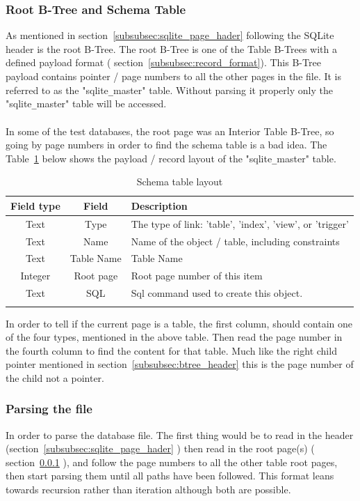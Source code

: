 \subsubsection{Root B-Tree and Schema Table}
\label{subsubsec:schema_table}

As mentioned in section~\ref{subsubsec:sqlite_page_hader} following the SQLite header is the root B-Tree. The root B-Tree is one of the Table B-Trees with a defined payload format ( section~\ref{subsubsec:record_format}). This B-Tree payload contains pointer / page numbers to all the other pages in the file. It is referred to as the "sqlite\verb|_|master" table. Without parsing it properly only the "sqlite\verb|_|master" table will be accessed.
\\\\
In some of the test databases, the root page was an Interior Table B-Tree, so going by page numbers in order to find the schema table is a bad idea. The Table~\ref{tbl:schema_table} below shows the payload / record layout of the "sqlite\verb|_|master" table.

\begin{longtable}[h]{| c | c| p{10cm} |}
		\hline
			\textbf{Field type} & \textbf{Field} & \textbf{Description} \\ 
		\hline
		\endhead
			Text & Type & The type of link: 'table', 'index', 'view', or 'trigger' \\
		\hline
			Text & Name & Name of the object / table, including constraints \\
		\hline
			Text & Table Name & Table Name \\
		\hline
			Integer & Root page & Root page number of this item \\
		\hline
			Text & SQL & Sql command used to create this object. \\
		\hline
	\caption{Schema table layout}
	\label{tbl:schema_table}
\end{longtable}

In order to tell if the current page is a table, the first column, should contain one of the four types, mentioned in the above table. Then read the page number in the fourth column to find the content for that table. Much like the right child pointer mentioned in section~\ref{subsubsec:btree_header} this is the page number of the child not a pointer.

\subsubsection{Parsing the file}
\label{subsubsec:parsing the file}

In order to parse the database file. The first thing would be to read in the header (section~\ref{subsubsec:sqlite_page_hader} ) then read in the root page(s) ( section~\ref{subsubsec:schema_table} ), and follow the page numbers to all the other table root pages, then start parsing them until all paths have been followed. This format leans towards recursion rather than iteration although both are possible.
